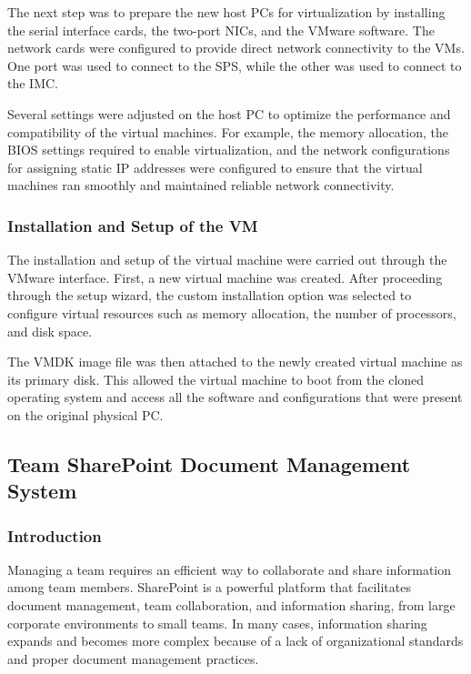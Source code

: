 The next step was to prepare the new host \acp{PC} for virtualization by installing the serial interface cards, the two-port \acp{NIC}, and the VMware software. The network cards were configured to provide direct network connectivity to the \acp{VM}. One port was used to connect to the SPS, while the other was used to connect to the IMC.

Several settings were adjusted on the host \ac{PC} to optimize the performance and compatibility of the virtual machines. For example, the memory allocation, the \ac{BIOS} settings required to enable virtualization, and the network configurations for assigning static IP addresses were configured to ensure that the virtual machines ran smoothly and maintained reliable network connectivity.

\subsubsection{Installation and Setup of the VM}

The installation and setup of the virtual machine were carried out through the VMware interface. First, a new virtual machine was created. After proceeding through the setup wizard, the custom installation option was selected to configure virtual resources such as memory allocation, the number of processors, and disk space.

The \ac{VMDK} image file was then attached to the newly created virtual machine as its primary disk. This allowed the virtual machine to boot from the cloned operating system and access all the software and configurations that were present on the original physical \ac{PC}.

\subsection{Team SharePoint Document Management System}

\subsubsection{Introduction}

Managing a team requires an efficient way to collaborate and share information among team members. SharePoint is a powerful platform that facilitates document management, team collaboration, and information sharing, from large corporate environments to small teams. In many cases, information sharing expands and becomes more complex because of a lack of organizational standards and proper document management practices.

